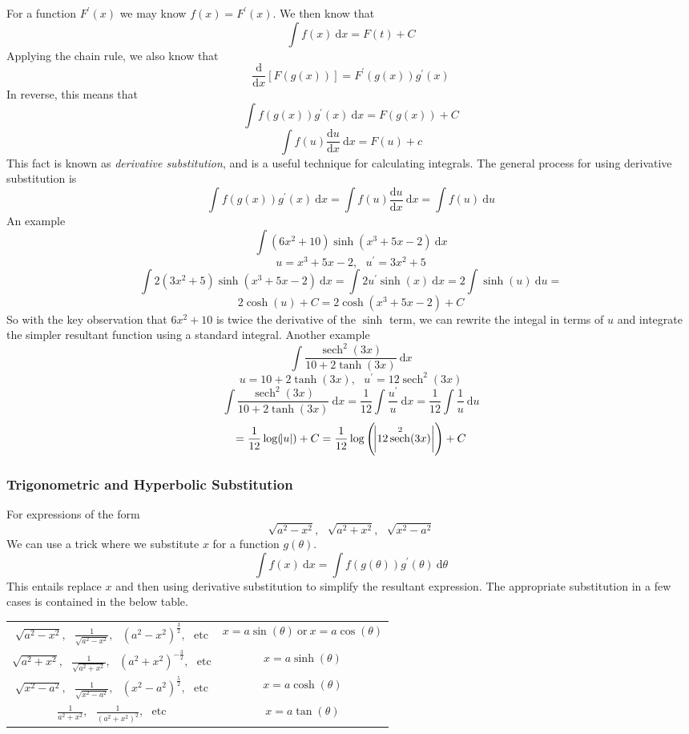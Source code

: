 \documentclass[12pt]{report}
\newcommand{\dx}{\:\mathrm{d}x}
\newcommand{\dd}[2]{\frac{\mathrm{d}#1}{\mathrm{d}#2}}
\newcommand{\mor}{\:\mathrm{or}\:}
\newcommand{\derivx}[1]{\frac{\mathrm{d}}{\mathrm{d}x}\left[#1\right]}
\DeclareMathOperator{\sech}{sech}
\begin{document}
\begin{flushleft}
For a function \(F^\prime(x)\) we may know \(f(x) = F^\prime(x)\). We then know
that
\[\int f(x) \dx = F(t) + C\]
Applying the chain rule, we also know that
\[\derivx{F(g(x))} = F^\prime(g(x))g^\prime(x)\]
In reverse, this means that
\[\int f(g(x))g^\prime(x) \dx = F(g(x)) + C\]
\[\int f(u)\dd{u}{x}\dx = F(u) + c\]
This fact is known as \textit{derivative substitution}, and is a useful
technique for calculating integrals. The general process for using derivative
substitution is
\[\int f(g(x))g^\prime(x)\dx = \int f(u)\dd{u}{x}\dx 
= \int f(u) \:\mathrm{d}u\]
An example
\[\int (6x^2 + 10)\sinh(x^3 + 5x - 2)\dx\]
\[u = x^3 + 5x - 2, \:\:\: u^\prime = 3x^2 + 5\]
\[\int 2(3x^2 + 5)\sinh(x^3 + 5x - 2)\dx = \int 2u^\prime\sinh(x)\dx
= 2\int\sinh(u) \:\mathrm{d}u = \]
\[2\cosh(u) + C = 2\cosh(x^3 + 5x - 2) + C\]
So with the key observation that \(6x^2 + 10\) is twice the derivative of the
\(\sinh\) term, we can rewrite the integal in terms of \(u\) and integrate the
simpler resultant function using a standard integral. Another example
\[\int\frac{\sech^2(3x)}{10 + 2\tanh(3x)}\dx\]
\[u = 10 + 2\tanh(3x), \:\:\: u^\prime = 12\sech^2(3x)\]
\[\int\frac{\sech^2(3x)}{10 + 2\tanh(3x)}\dx 
= \frac{1}{12}\int\frac{u^\prime}{u}\dx = \frac{1}{12}\int\frac{1}{u}
\:\mathrm{d}u\]
\[= \frac{1}{12}\log(\abs{u}) + C 
= \frac{1}{12}\log\left(\abs{12\sech^2(3x)}\right) + C\]

\subsubsection*{Trigonometric and Hyperbolic Substitution}

For expressions of the form
\[\sqrt{a^2 - x^2}, \:\:\: \sqrt{a^2 + x^2}, \:\:\: \sqrt{x^2 - a^2}\]
We can use a trick where we substitute \(x\) for a function \(g(\theta)\).
\[\int f(x)\dx = \int f(g(\theta))g^\prime(\theta) \:\mathrm{d}\theta\]
This entails replace \(x\) and then using derivative substitution to simplify
the resultant expression. The appropriate substitution in a few cases is
contained in the below table.

\renewcommand{\arraystretch}{2}
\begin{center}    
    \begin{tabular}{||c|c||}
        \(\sqrt{a^2 - x^2}, \:\:\: \frac{1}{\sqrt{a^2 - x^2}},
        \:\:\: (a^2 - x^2)^\frac{3}{2}, \:\:\: \mathrm{etc}\) &
        \(x = a\sin(\theta) \mor x = a\cos(\theta)\) \\
        \(\sqrt{a^2 + x^2}, \:\:\: \frac{1}{\sqrt{a^2 + x^2}},
        \:\:\: (a^2 + x^2)^{-\frac{3}{2}}, \:\:\: \mathrm{etc}\) &
        \(x = a\sinh(\theta)\) \\
        \(\sqrt{x^2 - a^2}, \:\:\: \frac{1}{\sqrt{x^2 - a^2}},
        \:\:\: (x^2 - a^2)^\frac{5}{2}, \:\:\: \mathrm{etc}\) &
        \(x = a\cosh(\theta)\) \\
        \(\frac{1}{a^2 + x^2}, \:\:\: \frac{1}{(a^2 + x^2)^2}, \:\:\:
        \mathrm{etc}\) &
        \(x = a\tan(\theta)\) \\
    \end{tabular}
\end{center}
\renewcommand{\arraystretch}{1}


\end{flushleft}
\end{document}
